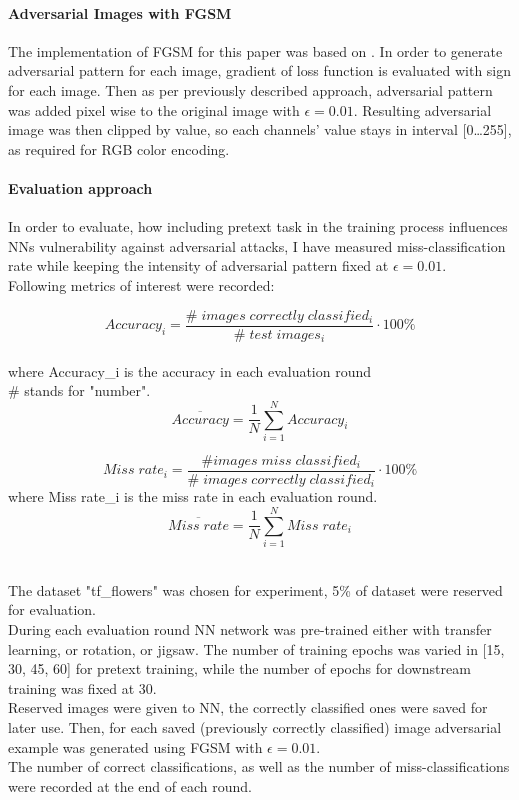 \paragraph{Adversarial Images with FGSM}
The implementation of FGSM for this paper was based on \cite{FGSM}.
In order to generate adversarial pattern for each image,
gradient of loss function is evaluated with sign for each image.
Then as per previously described approach,
adversarial pattern was added pixel wise to the original image with $\epsilon = 0.01$.
Resulting adversarial image was then clipped by value, so each channels' value stays in interval [0\ldots255],
as required for RGB color encoding.

\paragraph{Evaluation approach}
In order to evaluate, how including pretext task in the training process influences NNs vulnerability against adversarial attacks,
I have measured miss-classification rate while keeping the intensity of adversarial pattern fixed at $\epsilon = 0.01$.
\\
Following metrics of interest were recorded:

\begin{equation}
    Accuracy_i = \frac{\# \; images \; correctly \; classified_i}{\# \; test \; images_i} \cdot 100 \%
\end{equation} \\
where Accuracy\_i is the accuracy in each evaluation round \\
\# stands for "number".
\begin{equation}
    \overline{Accuracy} = \frac{1}{N}  \sum_{i=1}^{N}{Accuracy_i}
\end{equation}


\begin{equation}
    Miss \; rate_i = \frac{\# images \; miss \; classified_i}{\# \; images \; correctly \; classified_i} \cdot 100 \%
\end{equation}
where Miss rate\_i is the miss rate in each evaluation round.
\begin{equation}
    \overline{Miss \; rate} = \frac{1}{N}  \sum_{i=1}^{N}{Miss \; rate_i}
\end{equation}


\\
The dataset "tf\_flowers" \cite{tfflowers} was chosen for experiment, 5\% of dataset were reserved for evaluation.
\\
During each evaluation round NN network was pre-trained either with transfer learning, or rotation, or jigsaw.
The number of training epochs was varied in [15, 30, 45,
60] for pretext training, while the number of epochs for downstream
training was fixed at 30.
\\
Reserved images were given to NN, the correctly classified ones were saved for later use.
Then, for each saved (previously correctly classified) image adversarial example was generated
using FGSM with $\epsilon = 0.01$.
\\
The number of correct classifications,
as well as the number of miss-classifications were recorded at the end of each round.
